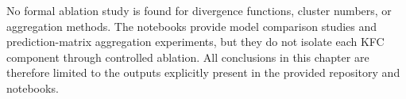 No formal ablation study is found for divergence functions, cluster numbers, or aggregation methods. The notebooks provide model comparison studies and prediction-matrix aggregation experiments, but they do not isolate each KFC component through controlled ablation. All conclusions in this chapter are therefore limited to the outputs explicitly present in the provided repository and notebooks.
